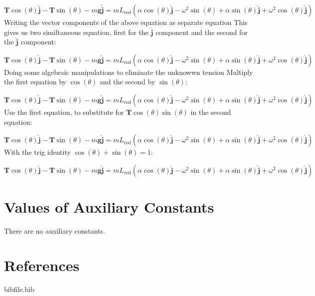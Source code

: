 \documentclass[12pt]{article}
\begin{document}
\begin{displaymath}
\mathbf{T} \cos\left(θ\right) \mathbf{\hat{j}}-\mathbf{T} \sin\left(θ\right)-m \mathbf{g} \mathbf{\hat{j}}=m {L_{\text{rod}}} \left(α \cos\left(θ\right) \mathbf{\hat{j}}-ω^{2} \sin\left(θ\right)+α \sin\left(θ\right) \mathbf{\hat{j}}+ω^{2} \cos\left(θ\right) \mathbf{\hat{j}}\right)
\end{displaymath}
Writing the vector components of the above equation as separate equation This gives us two similtaneous equation, first for the $\mathbf{\hat{j}}$ component and the second for the $\mathbf{\hat{j}}$ component:

\begin{displaymath}
\mathbf{T} \cos\left(θ\right) \mathbf{\hat{j}}-\mathbf{T} \sin\left(θ\right)-m \mathbf{g} \mathbf{\hat{j}}=m {L_{\text{rod}}} \left(α \cos\left(θ\right) \mathbf{\hat{j}}-ω^{2} \sin\left(θ\right)+α \sin\left(θ\right) \mathbf{\hat{j}}+ω^{2} \cos\left(θ\right) \mathbf{\hat{j}}\right)
\end{displaymath}
Doing some algebraic manipulations to eliminate the unknowwn tension Multiply the first equation by $\cos\left(θ\right)$ and the second by $\sin\left(θ\right)$:

\begin{displaymath}
\mathbf{T} \cos\left(θ\right) \mathbf{\hat{j}}-\mathbf{T} \sin\left(θ\right)-m \mathbf{g} \mathbf{\hat{j}}=m {L_{\text{rod}}} \left(α \cos\left(θ\right) \mathbf{\hat{j}}-ω^{2} \sin\left(θ\right)+α \sin\left(θ\right) \mathbf{\hat{j}}+ω^{2} \cos\left(θ\right) \mathbf{\hat{j}}\right)
\end{displaymath}
Use the first equation, to substitute for $\mathbf{T} \cos\left(θ\right) \sin\left(θ\right)$ in the second equation:

\begin{displaymath}
\mathbf{T} \cos\left(θ\right) \mathbf{\hat{j}}-\mathbf{T} \sin\left(θ\right)-m \mathbf{g} \mathbf{\hat{j}}=m {L_{\text{rod}}} \left(α \cos\left(θ\right) \mathbf{\hat{j}}-ω^{2} \sin\left(θ\right)+α \sin\left(θ\right) \mathbf{\hat{j}}+ω^{2} \cos\left(θ\right) \mathbf{\hat{j}}\right)
\end{displaymath}
With the trig identity $\cos\left(θ\right)+\sin\left(θ\right)=1$:

\begin{displaymath}
\mathbf{T} \cos\left(θ\right) \mathbf{\hat{j}}-\mathbf{T} \sin\left(θ\right)-m \mathbf{g} \mathbf{\hat{j}}=m {L_{\text{rod}}} \left(α \cos\left(θ\right) \mathbf{\hat{j}}-ω^{2} \sin\left(θ\right)+α \sin\left(θ\right) \mathbf{\hat{j}}+ω^{2} \cos\left(θ\right) \mathbf{\hat{j}}\right)
\end{displaymath}
\section{Values of Auxiliary Constants}
\label{Sec:AuxConstants}
There are no auxiliary constants.

\section{References}
\label{Sec:References}
\begin{filecontents*}{bibfile.bib}
\end{filecontents*}
\nocite{*}
\printbibliography[heading=none]
\end{document}
